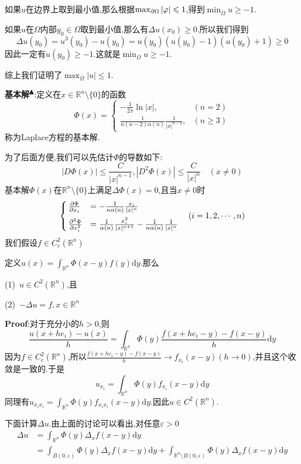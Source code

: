 如果$u$在边界上取到最小值,那么根据$\max_{\partial\Omega}|\varphi|\leqslant 1$,得到$\min_{\overline{\Omega}}u\geqslant -1$.\par
如果$u$在$\Omega$内部$y_0\in\Omega$取到最小值,那么有$\Delta u(x_0)\geqslant 0$.所以我们得到
$$
\Delta u(y_0)=u^3(y_0)-u(y_0)=u(y_0)(u(y_0)-1)(u(y_0)+1)\geqslant 0
$$
因此一定有$u(y_0)\geqslant -1$.这就是$\min_{\overline{\Omega}}u\geqslant -1$.\par
综上我们证明了$\max_{\overline{\Omega}}|u|\leqslant 1$.\par
\textbf{基本解}$^\clubsuit $:定义在$x\in\mathbb{R}^n\setminus \{0\}$的函数
$$
\Phi (x)=
\begin{cases}
    -\frac{1}{2\pi}\ln |x|,&(n=2)\\[3pt]
    \frac{1}{n(n-2)\alpha(n)}\frac{1}{|x|^{n-2}}, &(n\geqslant 3)
\end{cases}
$$
称为Laplace方程的基本解.\par
为了后面方便,我们可以先估计$\Phi$的导数如下:
$$
|D\Phi(x)|\leqslant \frac{C}{|x|^{n-1}},|D^2\Phi(x)|\leqslant \frac{C}{|x|^n}\quad (x\neq 0)
$$
基本解$\Phi(x)$在$\mathbb{R}^n\setminus \{0\}$上满足$\Delta \Phi(x)=0$,且当$x\neq 0$时
$$
\begin{cases}
    \frac{\partial \Phi}{\partial x_i} &= -\frac{1}{n\alpha(n)}\frac{x_i}{|x|^n}\\[6pt]
    \frac{\partial^2 \Phi}{\partial x_i^2} &= \frac{1}{\alpha(n)}\frac{x_i^2}{|x|^{n+1}}-\frac{1}{n\alpha(n)}\frac{1}{|x|^n}
\end{cases}
\quad (i=1,2,\cdots,n)
$$
\qquad 我们假设$f\in C^2_c(\mathbb{R}^n)$
\begin{tcolorbox}[colback=KuangNei,colframe=BianKuang,title=\textbf{Poisson方程的解},sharpish corners]
    定义$u(x)=\int_{\mathbb{R}^n}\Phi(x-y)f(y)\mathrm{d}y$.那么\par
    (1)\, $u\in C^2(\mathbb{R}^n)$,且\par
    (2)\, $-\Delta u=f,x\in\mathbb{R}^n$
\end{tcolorbox}
\textbf{Proof}:对于充分小的$h>0$,则
$$
\frac{u(x+he_i)-u(x)}{h}=\int_{\mathbb{R}^n}\Phi(y)\frac{f(x+he_i-y)-f(x-y)}{h}\mathrm{d}y
$$
因为$f\in C^2_c(\mathbb{R}^n)$,所以$\frac{f(x+he_i-y)-f(x-y)}{h}\to f_{x_i}(x-y)(h\to 0)$,并且这个收敛是一致的.于是
$$
u_{x_i}=\int_{\mathbb{R}^n}\Phi(y)f_{x_i}(x-y)\mathrm{d}y
$$
同理有$u_{x_ix_i}=\int_{\mathbb{R}^n}\Phi(y)f_{x_ix_i}(x-y)\mathrm{d}y$.因此$u\in C^2(\mathbb{R}^n)$.\par
下面计算$\Delta u$.由上面的讨论可以看出,对任意$\varepsilon>0$
$$
\begin{aligned}
    \Delta u &= \int_{\mathbb{R}^n}\Phi(y)\Delta_{x}f(x-y)\mathrm{d}y\\
             &= \int_{B(0,\varepsilon)}\Phi(y)\Delta_{x}f(x-y)\mathrm{d}y+\int_{\mathbb{R}^n\setminus B(0,\varepsilon)}\Phi(y)\Delta_{x}f(x-y)\mathrm{d}y
\end{aligned}
$$
